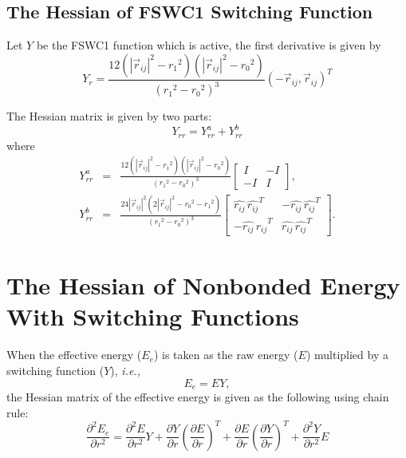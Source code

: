 \documentclass[11pt]{article}
\newcommand{\hatr}[1]{\mbox{$\hat{{r}_{#1}}$}}
\begin{document}
\subsection{The Hessian of FSWC1 Switching Function}
Let $Y$ be the FSWC1 function which is active, the first derivative is
given by
\begin{equation}
Y_r =\frac{\displaystyle 
12 (|\vec{r}_{ij}|^{2} - {r_1}^{2}) (|\vec{r}_{ij}|^{2}-{r_0}^{2})}
{\displaystyle ({r_1}^{2}-{r_0}^{2})^{3}} (-\vec{r}_{ij},\vec{r}_{ij})^T
\end{equation}

The Hessian matrix is given by two parts: 
\begin{equation}
Y_{rr} = Y_{rr}^a + Y_{rr}^b
\end{equation}
where
\begin{eqnarray}
Y_{rr}^a &=& \frac{\displaystyle 
12 (|\vec{r}_{ij}|^{2} - {r_1}^{2})(|\vec{r}_{ij}|^{2}-{r_0}^{2})}
{\displaystyle ({r_1}^{2}-{r_0}^{2})^{3}} 
\left[\begin{array}{cc}
 I & -I\\
-I &  I
\end{array}\right], \\
Y_{rr}^b &=& \frac{\displaystyle 
24 |\vec{r}_{ij}|^{2} (2 |\vec{r}_{ij}|^{2} - {r_0}^{2} - {r_1}^{2})}
{\displaystyle ({r_1}^{2}-{r_0}^{2})^{3}} 
\left[\begin{array}{cc}
\hatr{ij}\,\hatr{ij}^T & -\hatr{ij}\,\hatr{ij}^T \\
-\hatr{ij} \,\hatr{ij}^T & \hatr{ij}\,\hatr{ij}^T
\end{array}\right].
\end{eqnarray}

\section{The Hessian of Nonbonded Energy With Switching Functions}
When the effective energy ($E_e$) is taken as the raw energy ($E$) multiplied by a
switching function ($Y$), {\it i.e.,} 
\[
E_e = E Y,
\]
the Hessian matrix of the effective energy is
given as the following using chain rule:
\begin{equation}
\frac{\partial^2 E_e}{\partial r^2} = \frac{\partial^2 E}{\partial
r^2} Y + \frac{\partial Y}{\partial r} \left(\frac{\partial
E}{\partial r}\right)^T +  \frac{\partial E}{\partial
r}\left(\frac{\partial Y}{\partial r}\right)^T + \frac{\partial^2
Y}{\partial 
r^2} E
\end{equation}
\end{document}
